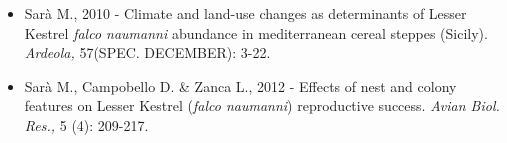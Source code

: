 \begin{itemize}
	\item Sar\`a M., 2010 - Climate and land-use changes as determinants of Lesser
Kestrel \textit{falco naumanni} abundance in mediterranean cereal
steppes (Sicily).\textit{ Ardeola, }57(SPEC. DECEMBER): 3-22.

	\item Sar\`a M., Campobello D. \& Zanca L., 2012 - Effects of nest and colony
features on Lesser Kestrel (\textit{falco naumanni}) reproductive
success.\textit{ Avian Biol. Res., }5 (4): 209-217.
\end{itemize}
